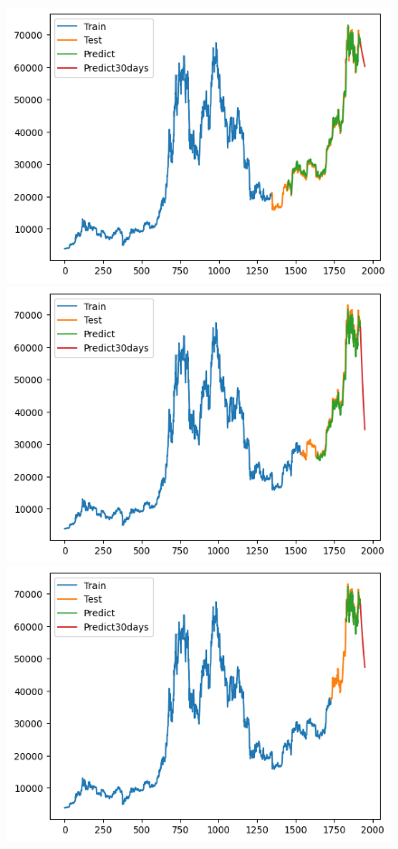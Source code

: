 \documentclass[conference]{IEEEtran}
\begin{document}
		\begin{figure}[H]
		\centering
		\begin{minipage}{0.15\textwidth}
			\centering
			\includegraphics[width=1\textwidth]{Figure/GRU_BTC_73.png}
		\end{minipage}
		\hfill
		\begin{minipage}{0.15\textwidth}
			\centering
			\includegraphics[width=1\textwidth]{Figure/GRU_BTC_82.png}
		\end{minipage}
		\hfill
		\begin{minipage}{0.15\textwidth}
			\centering
			\includegraphics[width=1\textwidth]{Figure/GRU_BTC_91.png}

\end{minipage}
\end{figure}
\end{document}
